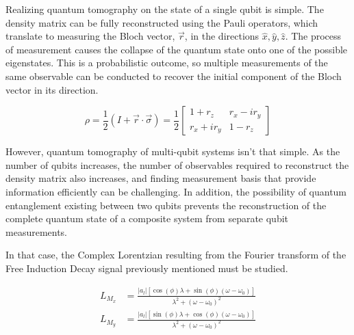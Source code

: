 Realizing quantum tomography on the state of a single qubit is simple. The density matrix can be fully reconstructed using the Pauli operators, which translate to measuring the Bloch vector, \(\vec{r}\), in the directions \(\hat{x},\hat{y},\hat{z}\). The process of measurement causes the collapse of the quantum state onto one of the possible eigenstates. This is a probabilistic outcome, so multiple measurements of the same observable can be conducted to recover the initial component of the Bloch vector in its direction. 

\begin{equation}
\rho = \frac{1}{2}\left(I + \vec{r}\cdot\vec{\sigma}\right)
= \frac{1}{2}
\begin{bmatrix}
1 + r_z & r_x - i r_y \\
r_x + i r_y & 1 - r_z
\end{bmatrix}
\end{equation}

However, quantum tomography of multi-qubit systems isn't that simple. As the number of qubits increases, the number of observables required to reconstruct the density matrix also increases, and finding measurement basis that provide information efficiently can be challenging. In addition, the possibility of quantum entanglement existing between two qubits prevents the reconstruction of the complete quantum state of a composite system from separate qubit measurements.

In that case, the Complex Lorentzian resulting from the Fourier transform of the Free Induction Decay signal previously mentioned must be studied.

\begin{equation}
\begin{aligned}
L_{M_x} &= \frac{\lvert a_l \rvert[\cos{(\phi)}\lambda+\sin{(\phi)}(\omega-\omega_0)]}{\lambda^2+{(\omega-\omega_0)}^2}\\
L_{M_y} &= \frac{\lvert a_l \rvert[\sin{(\phi)}\lambda+\cos{(\phi)}(\omega-\omega_0)]}{\lambda^2+{(\omega-\omega_0)}^2}
\end{aligned}
\label{eq:complex_lorentzian}
\end{equation}


